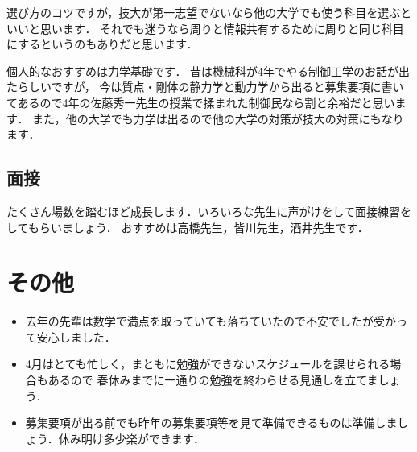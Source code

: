\documentclass[dvipdfmx]{jsarticle}
\begin{document}
選び方のコツですが，技大が第一志望でないなら他の大学でも使う科目を選ぶといいと思います．
それでも迷うなら周りと情報共有するために周りと同じ科目にするというのもありだと思います．

個人的なおすすめは力学基礎です．
昔は機械科が4年でやる制御工学のお話が出たらしいですが，
今は質点・剛体の静力学と動力学から出ると募集要項に書いてあるので4年の佐藤秀一先生の授業で揉まれた制御民なら割と余裕だと思います．
また，他の大学でも力学は出るので他の大学の対策が技大の対策にもなります．

\subsection{面接}
たくさん場数を踏むほど成長します．いろいろな先生に声がけをして面接練習をしてもらいましょう．
おすすめは高橋先生，皆川先生，酒井先生です．

\section{その他}
\begin{itemize}
  \item 去年の先輩は数学で満点を取っていても落ちていたので不安でしたが受かって安心しました．
  \item 4月はとても忙しく，まともに勉強ができないスケジュールを課せられる場合もあるので
        春休みまでに一通りの勉強を終わらせる見通しを立てましょう．
  \item 募集要項が出る前でも昨年の募集要項等を見て準備できるものは準備しましょう．休み明け多少楽ができます．
\end{itemize}
\end{document}
